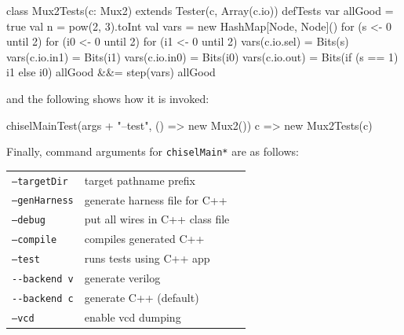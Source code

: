 \documentclass[10pt,twocolumn]{article}
\def\code#1{{\small\tt #1}}
\begin{document}
\begin{scala}
class Mux2Tests(c: Mux2) 
    extends Tester(c, Array(c.io)) {  
  defTests {
    var allGood = true
    val n = pow(2, 3).toInt
    val vars = new HashMap[Node, Node]()
    for (s <- 0 until 2) {
    for (i0 <- 0 until 2) {
    for (i1 <- 0 until 2) {
      vars(c.io.sel) = Bits(s)
      vars(c.io.in1) = Bits(i1)
      vars(c.io.in0) = Bits(i0)
      vars(c.io.out) = Bits(if (s == 1) i1 else i0)
      allGood &&= step(vars)
    } } } 
    allGood
  }
}
\end{scala}

\noindent
and the following shows how it is invoked:

\begin{scala}
chiselMainTest(args + "--test", () => new Mux2()){ 
  c => new Mux2Tests(c) 
}
\end{scala}

% 

Finally, command arguments for \code{chiselMain*} are as follows: \\

\begin{tabular}{lll}
\code{--targetDir} & target pathname prefix \\
\code{--genHarness} & generate harness file for C++ \\
\code{--debug} & put all wires in C++ class file \\
\code{--compile} & compiles generated C++ \\
\code{--test} & runs tests using C++ app \\
\verb+--backend v+ & generate verilog \\ 
\verb+--backend c+ & generate C++ (default)\\
\code{--vcd} & enable vcd dumping \\
\end{tabular}
\end{document}

